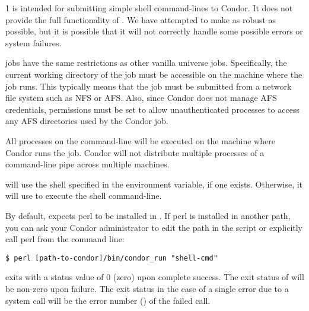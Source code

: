 \begin{ManPage}{\label{man-condor-run}}{1}
 is intended for submitting simple shell command-lines to
Condor.  It does not provide the full functionality of
.  We have attempted to make  as robust as
possible, but it is possible that it will not correctly handle some
possible  errors or system failures.

 jobs have the same restrictions as other vanilla universe
jobs.  Specifically, the current working directory of the job must be
accessible on the machine where the job runs.  This typically means
that the job must be submitted from a network file system such as NFS
or AFS.  Also, since Condor does not manage AFS credentials,
permissions must be set to allow unauthenticated processes to access
any AFS directories used by the Condor job.

All processes on the command-line will be executed on the machine
where Condor runs the job.  Condor will not distribute multiple
processes of a command-line pipe across multiple machines.

 will use the shell specified in the  environment
variable, if one exists.  Otherwise, it will use  to execute
the shell command-line.

By default,  expects perl to be installed in
.  If perl is installed in another path, you can
ask your Condor administrator to edit the path in the 
script or explicitly call perl from the command line:

\begin{verbatim}
$ perl [path-to-condor]/bin/condor_run "shell-cmd"
\end{verbatim}

\begin{Options}


\end{Options}

\ExitStatus

 exits with a status value of 0 (zero) upon complete success.
The exit status of  will be non-zero upon failure.
The exit status in the case of a single error due to a system call
will be the error number () of the failed call.

\end{ManPage}
